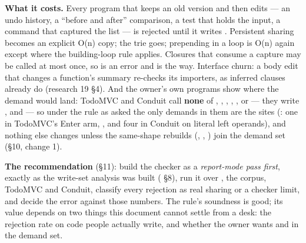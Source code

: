 \textbf{What it costs.} Every program that keeps an old version and then edits — an undo history, a “before and after” comparison, a test that holds the input, a command that captured the list — is rejected until it writes . Persistent sharing becomes an explicit O(n) copy; the trie goes; prepending in a loop is O(n) again except where the building-loop rule applies. Closures that consume a capture may be called at most once, so  is an error and  is the way. Interface churn: a body edit that changes a  function's summary re-checks its importers, as inferred  clauses already do (research 19 §4). And the owner's own programs show where the demand would land: TodoMVC and Conduit call \textbf{none} of , , , , ,  or  — they write ,  and \code{++} — so under the rule as asked the only demands in them are the \code{++} sites (: one in TodoMVC's Enter arm, , and four in Conduit on literal left operands), and nothing else changes unless the same-shape rebuilds (, , ) join the demand set (§10, change 1).

\textbf{The recommendation} (§11): build the checker as a \emph{report-mode pass first}, exactly as the write-set analysis was built ( §8), run it over , the corpus, TodoMVC and Conduit, classify every rejection as real sharing or a checker limit, and decide the error against those numbers. The rule's soundness is good; its value depends on two things this document cannot settle from a desk: the rejection rate on code people actually write, and whether the owner wants  and  in the demand set.
